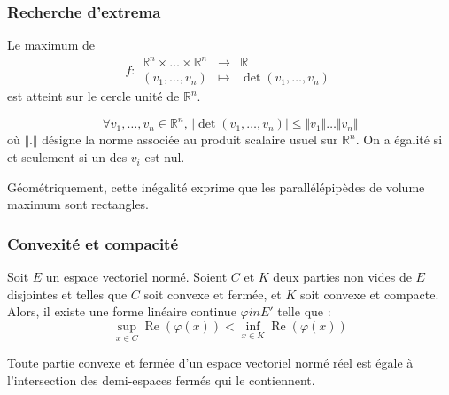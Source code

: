 	\subsubsection{Recherche d'extrema}


	\begin{proposition}
		Le maximum de
		\[
		f :
		\begin{array}{ccc}
			\mathbb{R}^n \times \dots \times \mathbb{R}^n &\rightarrow& \mathbb{R} \\
			(v_1, \dots, v_n) &\mapsto& \det(v_1, \dots, v_n)
		\end{array}
		\]
		est atteint sur le cercle unité de $\mathbb{R}^n$.
	\end{proposition}

	\begin{corollary}
		\[ \forall v_1, \dots, v_n \in \mathbb{R}^n, \, \vert \det(v_1, \dots, v_n) \vert \leq \Vert v_1 \Vert \dots \Vert v_n \Vert \]
		où $\Vert . \Vert$ désigne la norme associée au produit scalaire usuel sur $\mathbb{R}^n$. On a égalité si et seulement si un des $v_i$ est nul.
	\end{corollary}

	\begin{remark}
		Géométriquement, cette inégalité exprime que les parallélépipèdes de volume maximum sont rectangles.
	\end{remark}

	\subsubsection{Convexité et compacité}


	\begin{theorem}
		Soit $E$ un espace vectoriel normé. Soient $C$ et $K$ deux parties non vides de $E$ disjointes et telles que $C$ soit convexe et fermée, et $K$ soit convexe et compacte.
		Alors, il existe une forme linéaire continue $\varphi in E'$ telle que :
		\[ \sup_{x \in C} \operatorname{Re}(\varphi(x)) < \inf_{x \in K} \operatorname{Re}(\varphi(x)) \]
	\end{theorem}

	\begin{corollary}
		Toute partie convexe et fermée d'un espace vectoriel normé réel est égale à
		l'intersection des demi-espaces fermés qui le contiennent.
	\end{corollary}

